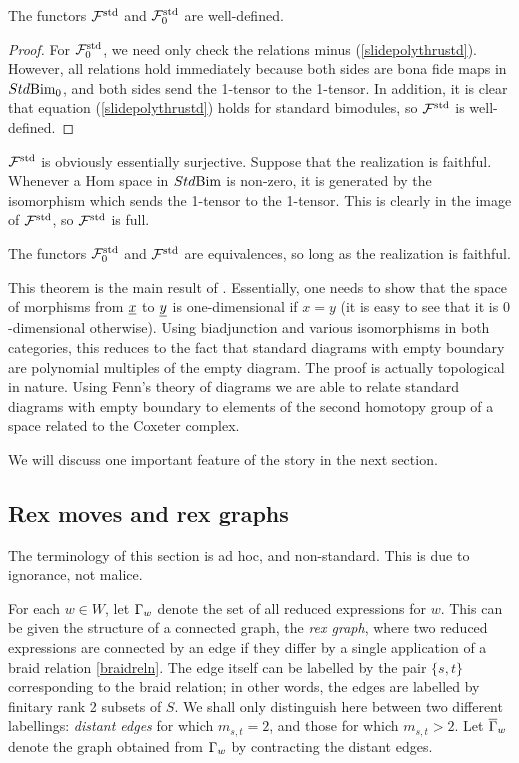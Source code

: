 \begin{claim} The functors ${\mathcal{F}}^{\textrm{std}}$ and ${\mathcal{F}}^{\textrm{std}}_0$ are well-defined. \end{claim}

\begin{proof} For ${\mathcal{F}}^{\textrm{std}}_0$, we need only check the relations minus (\ref{slidepolythrustd}). However, all relations hold immediately because both sides are bona fide maps in
$Std\textrm{Bim}_0$, and both sides send the 1-tensor to the 1-tensor. In addition, it is clear that equation (\ref{slidepolythrustd}) holds for standard bimodules, so ${\mathcal{F}}^{\textrm{std}}$ is well-defined.
\end{proof}

${\mathcal{F}}^{\textrm{std}}$ is obviously essentially surjective. Suppose that the realization is faithful. Whenever a Hom space in $Std\textrm{Bim}$ is non-zero, it is generated by the isomorphism which sends the
1-tensor to the 1-tensor. This is clearly in the image of ${\mathcal{F}}^{\textrm{std}}$, so ${\mathcal{F}}^{\textrm{std}}$ is full.

\begin{thm} The functors ${\mathcal{F}}^{\textrm{std}}_0$ and ${\mathcal{F}}^{\textrm{std}}$ are equivalences, so long as the realization is faithful. \label{FStdEquiv} \end{thm}

This theorem is the main result of \cite{EWFenn}. Essentially, one needs to show that the space of morphisms from ${\underline{x}}$ to ${\underline{y}}$ is one-dimensional if $x=y$ (it is easy to see
that it is $0$-dimensional otherwise). Using biadjunction and various isomorphisms in both categories, this reduces to the fact that standard diagrams with empty boundary are polynomial
multiples of the empty diagram. The proof is actually topological in nature. Using Fenn's theory of diagrams \cite{Fenn} we are able to relate standard diagrams with empty boundary to
elements of the second homotopy group of a space related to the Coxeter complex.

We will discuss one important feature of the story in the next section.

\subsection{Rex moves and rex graphs}
\label{subsec-RexMoves}

The terminology of this section is ad hoc, and non-standard. This is due to ignorance, not malice.

For each $w \in W$, let $\Gamma_w$ denote the set of all reduced expressions for $w$. This can be given the structure of a connected graph, the \emph{rex graph},  where two reduced expressions are connected by an edge if they differ by a single application of a braid relation \eqref{braidreln}. The edge itself can be labelled by the pair $\{s,t\}$ corresponding to the braid
relation; in other words, the edges are labelled by finitary rank 2 subsets of $S$. We shall only distinguish here between two different labellings: \emph{distant edges} for which
$m_{s,t}=2$, and those for which $m_{s,t}>2$. Let $\overline{\Gamma}_w$ denote the graph obtained from $\Gamma_w$ by contracting the distant edges.

